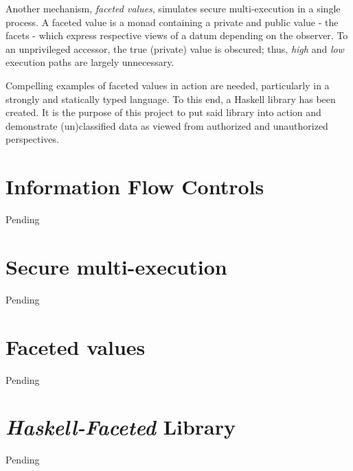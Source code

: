 \documentclass[12pt,a4paper]{article}
\begin{document}
		Another mechanism, \textit{faceted values}\cite{AustinFlanagan2012}, simulates secure multi-execution in a single process. A faceted value is a monad containing a private and public value - the facets - which express respective views of a datum depending on the observer. To an unprivileged accessor, the true (private) value is obscured; thus, \textit{high} and \textit{low} execution paths are largely unnecessary. 
		
		Compelling examples of faceted values in action are needed, particularly in a strongly and statically typed language. To this end, a Haskell library has been created.\cite{AustinKnowlesFlanagan2014} It is the purpose of this project to put said library into action and demonstrate (un)classified data as viewed from authorized and unauthorized perspectives.
	
	\section{Information Flow Controls}
		Pending
		
	\section{Secure multi-execution}
		Pending
	
	\section{Faceted values}
		Pending
	
	\section{\textit{Haskell-Faceted} Library}
		Pending
	
\end{document}
